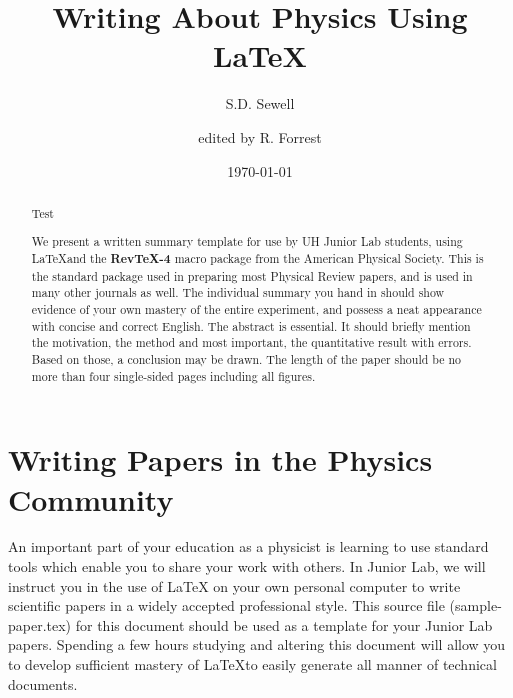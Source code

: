 \documentclass[aps,twocolumn,secnumarabic,nobalancelastpage,amsmath,amssymb,nofootinbib]{revtex4}
\begin{document}
\title{Writing About Physics Using \LaTeX}
\author         {S.D. Sewell}
\author    {edited by R. Forrest}
\date{\today}



\begin{abstract}

Test

We present a written summary template for use by UH Junior Lab
students, using \LaTeX and the {\bf RevTeX-4} macro package from the
American Physical Society.  This is the standard package used in
preparing most Physical Review papers, and is used in many other
journals as well.  The individual summary you hand in should show
evidence of your own mastery of the entire experiment, and possess a
neat appearance with concise and correct English.  The abstract is
essential.  It should briefly mention the motivation, the method and
most important, the quantitative result with errors.  Based on
those, a conclusion may be drawn.  The length of the paper should be
no more than four single-sided pages including all figures.

\end{abstract}



\maketitle

\section{Writing Papers in the Physics Community}

An important part of your education as a physicist is learning to
use standard tools which enable you to share your work with
others. In Junior Lab, we will instruct you in the use of \LaTeX
 on your own personal computer to write scientific papers in
a widely accepted professional style. This source file
(sample-paper.tex) for this document should be used as a template
for your Junior Lab papers. Spending a few hours studying and
altering this document will allow you to develop sufficient
mastery of \LaTeX  to easily generate all manner of technical
documents.
\end{document}
